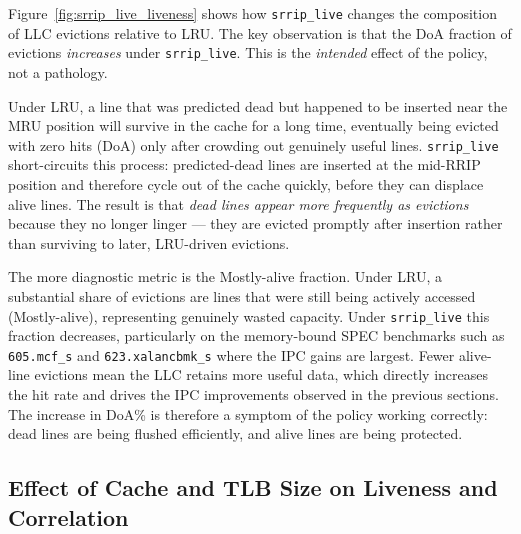 \documentclass[12pt]{article}
\begin{document}
Figure~\ref{fig:srrip_live_liveness} shows how \texttt{srrip\_live} changes the
composition of LLC evictions relative to LRU.  The key observation is that the
DoA fraction of evictions \emph{increases} under \texttt{srrip\_live}.  This is
the \emph{intended} effect of the policy, not a pathology.

Under LRU, a line that was predicted dead but happened to be inserted near the
MRU position will survive in the cache for a long time, eventually being evicted
with zero hits (DoA) only after crowding out genuinely useful lines.
\texttt{srrip\_live} short-circuits this process: predicted-dead lines are
inserted at the mid-RRIP position and therefore cycle out of the cache quickly,
before they can displace alive lines.  The result is that \emph{dead lines appear
more frequently as evictions} because they no longer linger --- they are evicted
promptly after insertion rather than surviving to later, LRU-driven evictions.

The more diagnostic metric is the Mostly-alive fraction.  Under LRU, a
substantial share of evictions are lines that were still being actively accessed
(Mostly-alive), representing genuinely wasted capacity.  Under
\texttt{srrip\_live} this fraction decreases, particularly on the memory-bound
SPEC benchmarks such as \texttt{605.mcf\_s} and \texttt{623.xalancbmk\_s} where
the IPC gains are largest.  Fewer alive-line evictions mean the LLC retains more
useful data, which directly increases the hit rate and drives the IPC
improvements observed in the previous sections.  The increase in DoA\% is
therefore a symptom of the policy working correctly: dead lines are being
flushed efficiently, and alive lines are being protected.

\subsection{Effect of Cache and TLB Size on Liveness and Correlation}
\label{sec:size_study}
\end{document}
